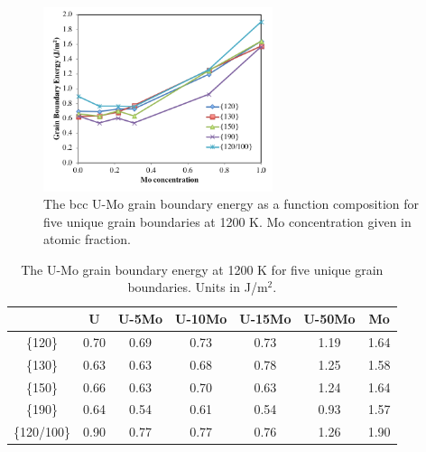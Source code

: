 \documentclass[review]{elsarticle}
\providecommand{\DIFaddbeginFL}{} %
\providecommand{\DIFaddendFL}{} %
\providecommand{\DIFdelbeginFL}{} %
\providecommand{\DIFdelendFL}{} %
\newcommand{\DIFscaledelfig}{0.5}
\newlength{\DIFdelgraphicswidth} %
\newlength{\DIFdelgraphicsheight} %
\newcommand{\DIFaddincludegraphics}[2][]{{\color{blue}\fbox{\DIFOincludegraphics[#1]{#2}}}} %
\newcommand{\DIFdelincludegraphics}[2][]{%
\sbox{\DIFdelgraphicsbox}{\DIFOincludegraphics[#1]{#2}}%
\settoboxwidth{\DIFdelgraphicswidth}{\DIFdelgraphicsbox} %
\settoboxtotalheight{\DIFdelgraphicsheight}{\DIFdelgraphicsbox} %
\scalebox{\DIFscaledelfig}{%
\parbox[b]{\DIFdelgraphicswidth}{\usebox{\DIFdelgraphicsbox}\\[-\baselineskip] \rule{\DIFdelgraphicswidth}{0em}}\llap{\resizebox{\DIFdelgraphicswidth}{\DIFdelgraphicsheight}{%
\setlength{\unitlength}{\DIFdelgraphicswidth}%
\begin{picture}(1,1)%
\thicklines\linethickness{2pt} %
{\color[rgb]{1,0,0}\put(0,0){\framebox(1,1){}}}%
{\color[rgb]{1,0,0}\put(0,0){\line( 1,1){1}}}%
{\color[rgb]{1,0,0}\put(0,1){\line(1,-1){1}}}%
\end{picture}%
}\hspace*{3pt}}} %
} %
\DeclareRobustCommand{\DIFaddbeginFL}{\DIFOaddbeginFL \let\includegraphics\DIFaddincludegraphics} %
\DeclareRobustCommand{\DIFaddendFL}{\DIFOaddendFL \let\includegraphics\DIFOincludegraphics} %
\DeclareRobustCommand{\DIFdelbeginFL}{\DIFOdelbeginFL \let\includegraphics\DIFdelincludegraphics} %
\DeclareRobustCommand{\DIFdelendFL}{\DIFOaddendFL \let\includegraphics\DIFOincludegraphics} %
\begin{document}
\begin{figure}[h]
 \centering
 \DIFdelbeginFL %
\DIFdelendFL \DIFaddbeginFL \includegraphics[width=0.6\textwidth]{uvsmo1200A.png} 
 \DIFaddendFL \caption{The bcc U-Mo grain boundary energy as a function composition for five unique grain boundaries at 1200 K. Mo concentration given in atomic fraction.}
 \label{fig:umo1200}
\end{figure}

\begin{table}[h]
\caption{The U-Mo grain boundary energy at 1200 K for five unique grain boundaries. Units in J/m$^{2}$. } \label{tab:umo1200}
\begin{center}
\begin{tabular}{|c|c|c|c|c|c|c|}
	\hline
 & U & U-5Mo & U-10Mo & U-15Mo & U-50Mo & Mo \\
\hline
\{120\}	 & 0.70 & 0.69 & 0.73 & 0.73 & 1.19 & 1.64 \\
\{130\}	 & 0.63 & 0.63 & 0.68 & 0.78 & 1.25 & 1.58 \\
\{150\}	 & 0.66 & 0.63 & 0.70 & 0.63 & 1.24 & 1.64 \\
\{190\}	 & 0.64 & 0.54 & 0.61 & 0.54 & 0.93 & 1.57 \\
\{120/100\} & 0.90 & 0.77 & 0.77 & 0.76 & 1.26 & 1.90 \\
 	 \hline
\end{tabular}
\end{center}
\label{default}
\end{table}

\FloatBarrier
\end{document}
